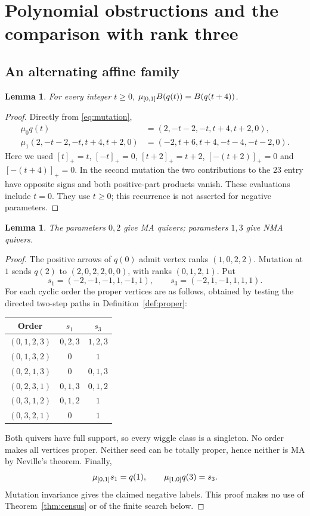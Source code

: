 \documentclass[11pt]{amsart}
\newtheorem{lemma}[theorem]{Lemma}
\theoremstyle{definition}\newtheorem{definition}[theorem]{Definition}
\theoremstyle{remark}\newtheorem{remark}[theorem]{Remark}
\begin{document}
\section{Polynomial obstructions and the comparison with rank three}\label{sec:polynomial}
\subsection{An alternating affine family}
\begin{lemma}\label{lem:recurrence}
For every integer $t\ge0$, $\mu_{[0,1]}B(q(t))=B(q(t+4))$.
\end{lemma}
\begin{proof}
Directly from \eqref{eq:mutation},
\begin{align*}
 \mu_0q(t)&=(2,-t-2,-t,t+4,t+2,0),\\
 \mu_1(2,-t-2,-t,t+4,t+2,0)&=(-2,t+6,t+4,-t-4,-t-2,0).
\end{align*}
Here we used $[t]_+=t$, $[-t]_+=0$, $[t+2]_+=t+2$, $[-(t+2)]_+=0$ and $[-(t+4)]_+=0$. In the second mutation the two contributions to the $23$ entry have opposite signs and both positive-part products vanish. These evaluations include $t=0$. They use $t\ge0$; this recurrence is not asserted for negative parameters.
\end{proof}

\begin{lemma}\label{lem:seeds}
The parameters $0,2$ give MA quivers; parameters $1,3$ give NMA quivers.
\end{lemma}
\begin{proof}
The positive arrows of $q(0)$ admit vertex ranks $(1,0,2,2)$. Mutation at $1$ sends $q(2)$ to $(2,0,2,2,0,0)$, with ranks $(0,1,2,1)$. Put
\[
 s_1=(-2,-1,-1,1,-1,1),\qquad s_3=(-2,1,-1,1,1,1).
\]
For each cyclic order the proper vertices are as follows, obtained by testing the directed two-step paths in Definition~\ref{def:proper}:
\begin{center}\begin{tabular}{ccc}\toprule
Order & $s_1$ & $s_3$\\\midrule
$(0,1,2,3)$ & $0,2,3$ & $1,2,3$\\
$(0,1,3,2)$ & $0$ & $1$\\
$(0,2,1,3)$ & $0$ & $0,1,3$\\
$(0,2,3,1)$ & $0,1,3$ & $0,1,2$\\
$(0,3,1,2)$ & $0,1,2$ & $1$\\
$(0,3,2,1)$ & $0$ & $1$\\\bottomrule
\end{tabular}\end{center}
Both quivers have full support, so every wiggle class is a singleton. No order makes all vertices proper. Neither seed can be totally proper, hence neither is MA by Neville's theorem. Finally,
\[
 \mu_{[0,1]}s_1=q(1),\qquad \mu_{[1,0]}q(3)=s_3.
\]
Mutation invariance gives the claimed negative labels. This proof makes no use of Theorem~\ref{thm:census} or of the finite search below.
\end{proof}
\end{document}
